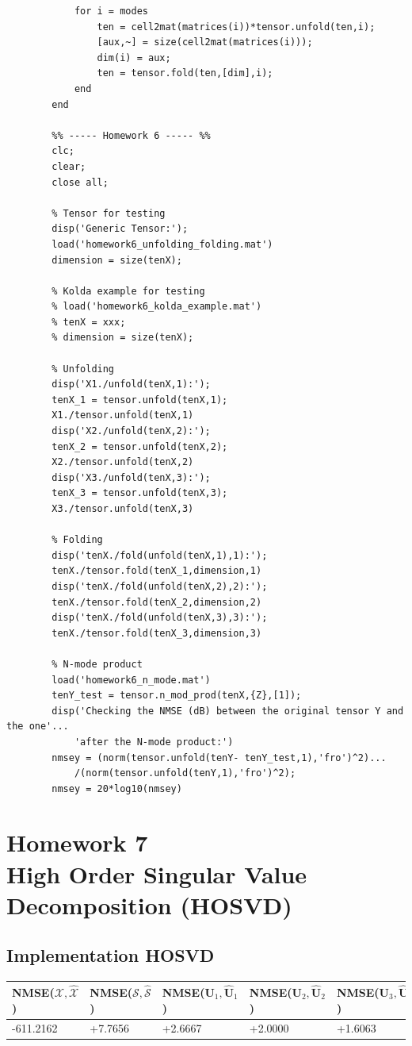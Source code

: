 \documentclass[a4paper,10pt]{article}
\begin{document}
\begin{verbatim}
            for i = modes
                ten = cell2mat(matrices(i))*tensor.unfold(ten,i);
                [aux,~] = size(cell2mat(matrices(i)));
                dim(i) = aux;
                ten = tensor.fold(ten,[dim],i);
            end
        end

        %% ----- Homework 6 ----- %%
        clc;
        clear;
        close all;

        % Tensor for testing
        disp('Generic Tensor:');
        load('homework6_unfolding_folding.mat')
        dimension = size(tenX);

        % Kolda example for testing
        % load('homework6_kolda_example.mat')
        % tenX = xxx;
        % dimension = size(tenX);

        % Unfolding
        disp('X1./unfold(tenX,1):');
        tenX_1 = tensor.unfold(tenX,1);
        X1./tensor.unfold(tenX,1)
        disp('X2./unfold(tenX,2):');
        tenX_2 = tensor.unfold(tenX,2);
        X2./tensor.unfold(tenX,2)
        disp('X3./unfold(tenX,3):');
        tenX_3 = tensor.unfold(tenX,3);
        X3./tensor.unfold(tenX,3)

        % Folding
        disp('tenX./fold(unfold(tenX,1),1):');
        tenX./tensor.fold(tenX_1,dimension,1)
        disp('tenX./fold(unfold(tenX,2),2):');
        tenX./tensor.fold(tenX_2,dimension,2)
        disp('tenX./fold(unfold(tenX,3),3):');
        tenX./tensor.fold(tenX_3,dimension,3)

        % N-mode product
        load('homework6_n_mode.mat')
        tenY_test = tensor.n_mod_prod(tenX,{Z},[1]);
        disp('Checking the NMSE (dB) between the original tensor Y and the one'... 
            'after the N-mode product:')
        nmsey = (norm(tensor.unfold(tenY- tenY_test,1),'fro')^2)...
            /(norm(tensor.unfold(tenY,1),'fro')^2);
        nmsey = 20*log10(nmsey)
    \end{verbatim}
    
\newpage
\section*{Homework 7 \\ High Order Singular Value Decomposition (HOSVD)}

    \subsection*{Implementation HOSVD}

    \begin{table}[ht!]
        \centering
        \begin{tabular}{|l|l|l|l|l|}
        \hline
        NMSE($\mathcal{X}, \mathcal{\hat{X}}$) & NMSE($\mathcal{S}, \mathcal{\hat{S}}$) & NMSE($\boldsymbol{U}_{1}, \boldsymbol{\hat{U}}_{1}$) & NMSE($\boldsymbol{U}_{2}, \boldsymbol{\hat{U}}_{2}$) & NMSE($\boldsymbol{U}_{3}, \boldsymbol{\hat{U}}_{3}$) \\ \hline
        -611.2162 & +7.7656 & +2.6667 & +2.0000 & +1.6063 \\ \hline
        \end{tabular}
    \end{table}
\end{document}
